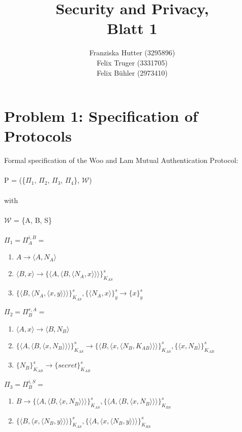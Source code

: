 \documentclass[12pt,pdftex,a4paper]{article}
\title{Security and Privacy,\\ Blatt 1}
\author{Franziska Hutter (3295896)\\
	Felix Truger (3331705)\\
	Felix Bühler (2973410)}
\newcommand\tab[1][1cm]{\hspace*{#1}}
\begin{document}
\maketitle
\pagebreak

\section*{Problem 1: Specification of Protocols}
Formal specification of the Woo and Lam Mutual Authentication Protocol:
\\~\\
P = (\{$\Pi_1$, $\Pi_2$, $\Pi_3$, $\Pi_4$\}, $\mathcal{W}$)\\~\\
with\\~\\
$\mathcal{W}$ = \{A, B, S\}\\~\\

$\Pi_1 = \Pi_A^{i,B} =$
\begin{enumerate}
	\item \tab $ A \rightarrow \langle A, N_A\rangle $
	\item \tab $ \langle B, x \rangle \rightarrow \{\langle A, \langle B, \langle N_A, x\rangle\rangle\rangle\}_{K_{AS}}^s$	
	\item \tab $ \{\langle B,\langle N_A, \langle x, y\rangle\rangle\rangle\}_{K_{AS}}^{s}, \{\langle N_A, x\rangle\}_y^s \rightarrow \{x\}_y^s $
\end{enumerate} 

$\Pi_2 = \Pi_B^{r,A} =$
\begin{enumerate}
\item \tab $\langle A, x\rangle \rightarrow \langle B, N_B \rangle$
\item \tab $\{\langle A, \langle B, \langle x, N_B \rangle\rangle\rangle\}_{K_{AS}}^s
\rightarrow \{\langle B,\langle x, \langle N_B, K_{AB}\rangle\rangle\rangle\}_{K_{AS}}^{s}, \{\langle x, N_B\rangle\}_{K_{AB}}^s$
\item \tab $ \{N_B\}_{K_{AB}}^s \rightarrow \{secret\}_{K_{AB}}^s$
\end{enumerate}

$\Pi_3 = \Pi_B^{i,S} =$
\begin{enumerate}
\item \tab $ B \rightarrow \{\langle A, \langle B, \langle x, N_B \rangle\rangle\rangle\}_{K_{AS}}^s, \{\langle A, \langle B, \langle x, N_B \rangle\rangle\rangle\}_{K_{BS}}^s $
\item \tab $ \{\langle B, \langle x, \langle N_B, y\rangle\rangle\rangle\}_{K_{AS}}^s,\{\langle A, \langle x, \langle N_B, y\rangle\rangle\rangle\}_{K_{BS}}^s $
\end{enumerate}
\end{document}
